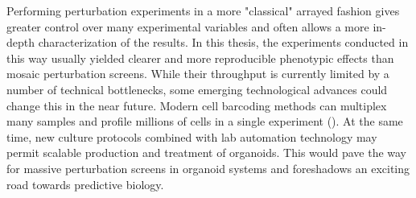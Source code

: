 Performing perturbation experiments in a more "classical" arrayed fashion gives greater control over many experimental variables and often allows a more in-depth characterization of the results. In this thesis, the experiments conducted in this way usually yielded clearer and more reproducible phenotypic effects than mosaic perturbation screens. While their throughput is currently limited by a number of technical bottlenecks, some emerging technological advances could change this in the near future. Modern cell barcoding methods can multiplex many samples and profile millions of cells in a single experiment (\cite{rosenberg_single-cell_2018,yin_high-throughput_2019,cao_comprehensive_2017}). At the same time, new culture protocols combined with lab automation technology may permit scalable production and treatment of organoids. This would pave the way for massive perturbation screens in organoid systems and foreshadows an exciting road towards predictive biology.

